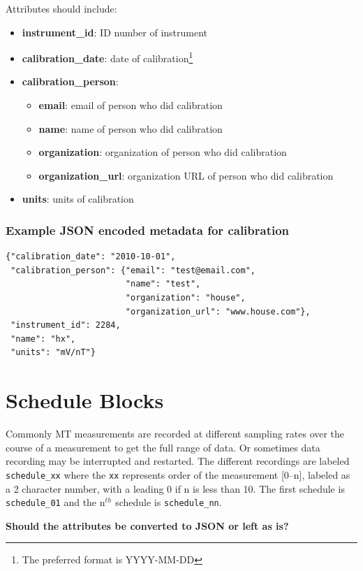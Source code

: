 \documentclass{article}
\newcommand{\attr}[1]{\textbf{#1}}
\begin{document}
Attributes should include:
\begin{itemize}
	\setlength{\itemsep}{.1em}
	\item \attr{instrument\_id}: ID number of instrument 
	\item \attr{calibration\_date}: date of calibration\footnote[1]{The preferred format is YYYY-MM-DD}
	\item \attr{calibration\_person}:
	\begin{itemize}
		\setlength{\itemsep}{.05em}
		\item \attr{email}: email of person who did calibration
		\item \attr{name}: name of person who did calibration
		\item \attr{organization}: organization of person who did calibration
		\item \attr{organization\_url}: organization URL of person who did calibration
	\end{itemize} 
	\item \attr{units}: units of calibration
\end{itemize} 

\subsubsection{Example JSON encoded metadata for \textbf{calibration}}
\begin{verbatim}
{"calibration_date": "2010-10-01",
 "calibration_person": {"email": "test@email.com",
                        "name": "test",
                        "organization": "house",
                        "organization_url": "www.house.com"},
 "instrument_id": 2284,
 "name": "hx",
 "units": "mV/nT"}
\end{verbatim}

\section{Schedule Blocks}

Commonly MT measurements are recorded at different sampling rates over the course of a measurement to get the full range of data.  Or sometimes data recording may be interrupted and restarted.  The different recordings are labeled \verb|schedule_xx| where the \verb|xx| represents order of the measurement [0--n], labeled as a 2 character number, with a leading 0 if n is less than 10.  The first schedule is \verb|schedule_01| and the n$^{th}$ schedule is \verb|schedule_nn|. 

\textbf{Should the attributes be converted to JSON or left as is?}
\end{document}
